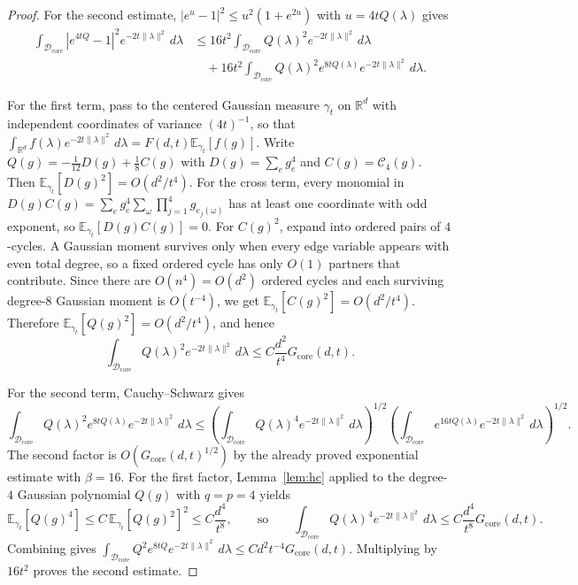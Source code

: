 \documentclass[11pt]{article}
\theoremstyle{definition}
\newcommand{\R}{\mathbb{R}}
\newcommand{\E}{\mathbb{E}}
\newcommand{\corereg}{\mathcal{D}_\mathrm{core}}
\newcommand{\core}{G_{\mathrm{core}}}
\begin{document}
\begin{proof}
For the second estimate, \(|e^u-1|^2\le u^2(1+e^{2u})\) with \(u=4tQ(\lambda)\) gives
\begin{align*}
  \int_{\corereg}|e^{4tQ}-1|^2e^{-2t\|\lambda\|^2}\,d\lambda
  &\le 16t^2\int_{\corereg}Q(\lambda)^2e^{-2t\|\lambda\|^2}\,d\lambda\\
  &\quad+
  16t^2\int_{\corereg}Q(\lambda)^2e^{8tQ(\lambda)}e^{-2t\|\lambda\|^2}\,d\lambda.
\end{align*}

For the first term, pass to the centered Gaussian measure \(\gamma_t\) on \(\R^d\) with independent coordinates of variance \((4t)^{-1}\), so that \(\int_{\R^d}f(\lambda)e^{-2t\|\lambda\|^2}\,d\lambda=F(d,t)\E_{\gamma_t}[f(g)]\).
Write \(Q(g)=-\tfrac1{12}D(g)+\tfrac18 C(g)\) with \(D(g)=\sum_e g_e^4\) and \(C(g)=\mathcal{C}_4(g)\).
Then \(\E_{\gamma_t}[D(g)^2]=O(d^2/t^4)\). For the cross term, every monomial in \(D(g)C(g)=\sum_e g_e^4\sum_\omega \prod_{j=1}^4g_{e_j(\omega)}\) has at least one coordinate with odd exponent, so \(\E_{\gamma_t}[D(g)C(g)]=0\).
For \(C(g)^2\), expand into ordered pairs of \(4\)-cycles. A Gaussian moment survives only when every edge variable appears with even total degree, so a fixed ordered cycle has only \(O(1)\) partners that contribute. Since there are \(O(n^4)=O(d^2)\) ordered cycles and each surviving degree-\(8\) Gaussian moment is \(O(t^{-4})\), we get \(\E_{\gamma_t}[C(g)^2]=O(d^2/t^4)\).
Therefore \(\E_{\gamma_t}[Q(g)^2]=O(d^2/t^4)\), and hence
\[
  \int_{\corereg}Q(\lambda)^2e^{-2t\|\lambda\|^2}\,d\lambda
  \le C\frac{d^2}{t^4}\core(d,t).
\]

For the second term, Cauchy--Schwarz gives
\[
  \int_{\corereg}Q(\lambda)^2e^{8tQ(\lambda)}e^{-2t\|\lambda\|^2}\,d\lambda
  \le
  \left(\int_{\corereg}Q(\lambda)^4e^{-2t\|\lambda\|^2}\,d\lambda\right)^{1/2}
  \left(\int_{\corereg}e^{16tQ(\lambda)}e^{-2t\|\lambda\|^2}\,d\lambda\right)^{1/2}.
\]
The second factor is \(O(\core(d,t)^{1/2})\) by the already proved exponential estimate with \(\beta=16\). For the first factor, Lemma~\ref{lem:hc} applied to the degree-\(4\) Gaussian polynomial \(Q(g)\) with \(q=p=4\) yields
\[
  \E_{\gamma_t}[Q(g)^4]
  \le C\,\E_{\gamma_t}[Q(g)^2]^2
  \le C\frac{d^4}{t^8},
  \qquad\text{so}\qquad
  \int_{\corereg}Q(\lambda)^4e^{-2t\|\lambda\|^2}\,d\lambda
  \le C\frac{d^4}{t^8}\core(d,t).
\]
Combining gives \(\int_{\corereg}Q^2e^{8tQ}e^{-2t\|\lambda\|^2}\,d\lambda\le Cd^2t^{-4}\core(d,t)\).
Multiplying by \(16t^2\) proves the second estimate.
\end{proof}
\end{document}
